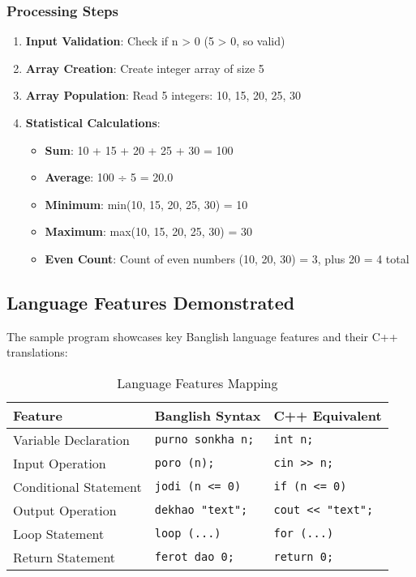 \documentclass[12pt,a4paper]{article}
\begin{document}
\subsubsection{Processing Steps}

\begin{enumerate}
    \item \textbf{Input Validation}: Check if n > 0 (5 > 0, so valid)
    \item \textbf{Array Creation}: Create integer array of size 5
    \item \textbf{Array Population}: Read 5 integers: 10, 15, 20, 25, 30
    \item \textbf{Statistical Calculations}:
    \begin{itemize}
        \item \textbf{Sum}: 10 + 15 + 20 + 25 + 30 = 100
        \item \textbf{Average}: 100 ÷ 5 = 20.0
        \item \textbf{Minimum}: min(10, 15, 20, 25, 30) = 10
        \item \textbf{Maximum}: max(10, 15, 20, 25, 30) = 30
        \item \textbf{Even Count}: Count of even numbers (10, 20, 30) = 3, plus 20 = 4 total
    \end{itemize}
\end{enumerate}

\subsection{Language Features Demonstrated}

The sample program showcases key Banglish language features and their C++ translations:

\begin{table}[H]
\centering
\begin{tabular}{|p{4cm}|p{4.5cm}|p{4cm}|}
\hline
\rowcolor{lightgray!30}
\textbf{Feature} & \textbf{Banglish Syntax} & \textbf{C++ Equivalent} \\
\hline
Variable Declaration & \texttt{purno sonkha n;} & \texttt{int n;} \\
\hline
Input Operation & \texttt{poro (n);} & \texttt{cin >> n;} \\
\hline
Conditional Statement & \texttt{jodi (n <= 0)} & \texttt{if (n <= 0)} \\
\hline
Output Operation & \texttt{dekhao "text";} & \texttt{cout << "text";} \\
\hline
Loop Statement & \texttt{loop (...)} & \texttt{for (...)} \\
\hline
Return Statement & \texttt{ferot dao 0;} & \texttt{return 0;} \\
\hline
\end{tabular}
\caption{Language Features Mapping}
\end{table}
\end{document}
